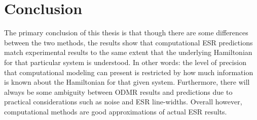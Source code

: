 \documentclass[oneside, noacknowlegments]{BYUPhys}
\begin{document}
\section{Conclusion}

The primary conclusion of this thesis is that though there are some differences between the two methods, the results show that computational ESR predictions match experimental results to the same extent that the underlying Hamiltonian for that particular system is understood. In other words: the level of precision that computational modeling can present is restricted by how much information is known about the Hamiltonian for that given system. Furthermore, there will always be some ambiguity between ODMR results and predictions due to practical considerations such as noise and ESR line-widths. Overall however, computational methods are good approximations of actual ESR results.







\printindex
\end{document}
